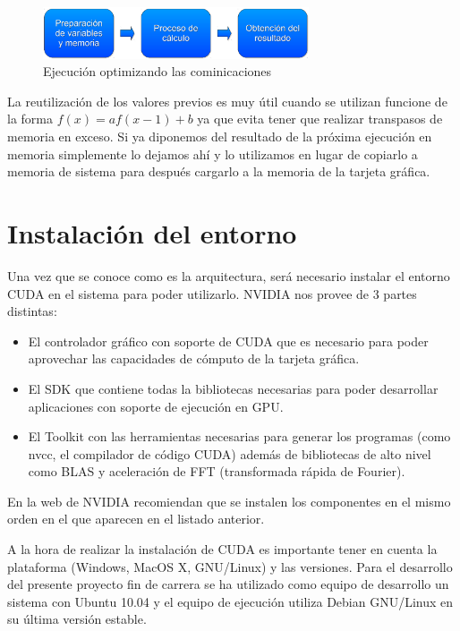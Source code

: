 \begin{figure}
	\centering
	\includegraphics[width=0.7\textwidth]{images/proc_ejec1.pdf}
	\caption{Ejecución optimizando las cominicaciones}\label{fig:cudaejecavanzada}
\end{figure}

La reutilización de los valores previos es muy útil cuando se utilizan funcione de la forma $f(x) = af(x-1)+b$ ya que evita tener que realizar transpasos de memoria en exceso. Si ya diponemos del resultado de la próxima ejecución en memoria simplemente lo dejamos ahí y lo utilizamos en lugar de copiarlo a memoria de sistema para después cargarlo a la memoria de la tarjeta gráfica.

\section{Instalación del entorno}

Una vez que se conoce como es la arquitectura, será necesario instalar el entorno CUDA en el sistema para poder utilizarlo. NVIDIA nos provee de 3 partes distintas:

\begin{itemize}
	\item El controlador gráfico con soporte de CUDA que es necesario para poder aprovechar las capacidades de cómputo de la tarjeta gráfica.
	\item El SDK que contiene todas la bibliotecas necesarias para poder desarrollar aplicaciones con soporte de ejecución en GPU.
	\item El Toolkit con las herramientas necesarias para generar los programas (como nvcc, el compilador de código CUDA) además de bibliotecas de alto nivel como BLAS y aceleración de FFT (transformada rápida de Fourier).
\end{itemize}

En la web de NVIDIA recomiendan que se instalen los componentes en el mismo orden en el que aparecen en el listado anterior.

A la hora de realizar la instalación de CUDA es importante tener en cuenta la plataforma (Windows, MacOS X, GNU/Linux) y las versiones. Para el desarrollo del presente proyecto fin de carrera se ha utilizado como equipo de desarrollo un sistema con Ubuntu 10.04 y el equipo de ejecución utiliza Debian GNU/Linux en su última versión estable.
